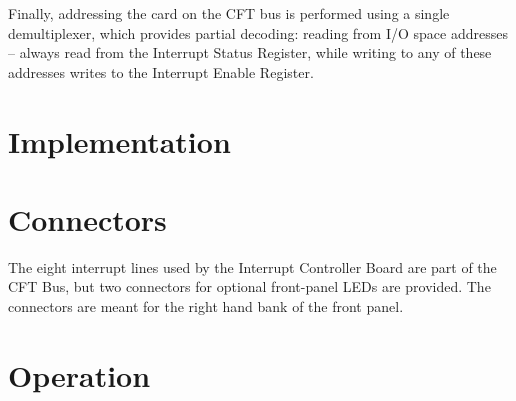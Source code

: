 Finally, addressing the card on the CFT bus is performed using a single
 demultiplexer, which provides partial decoding: reading from I/O space
addresses – always read from the Interrupt Status Register,
while writing to any of these addresses writes to the Interrupt Enable
Register.

\section{Implementation}


\section{Connectors}

The eight interrupt lines used by the Interrupt Controller Board are part of
the CFT Bus, but two connectors for optional front-panel LEDs are provided. The
connectors are meant for the right hand bank of the front panel.

\section{Operation}

